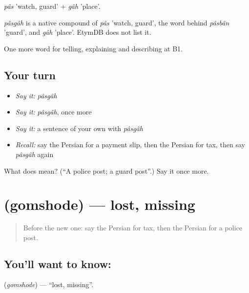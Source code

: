 \emph{pâs} 'watch, guard' + \emph{gâh} 'place'.

\begin{cousinweb}
\emph{pâsgâh} is a native compound of \emph{pâs} 'watch, guard', the word behind \emph{pâsbân} 'guard', and \emph{gâh} 'place'. EtymDB does not list it.
\end{cousinweb}

\begin{grammarlens}[title={What you've built}]
One more word for telling, explaining and describing at B1.
\end{grammarlens}

\subsection*{Your turn}
\begin{itemize}
\raggedright
  \item \emph{Say it:} \emph{pâsgâh}
  \item \emph{Say it:} \emph{pâsgâh}, once more
  \item \emph{Say it:} a sentence of your own with \emph{pâsgâh}
  \item \emph{Recall:} say the Persian for a payment slip, then the Persian for tax, then say \emph{pâsgâh} again
\end{itemize}

\begin{tcolorbox}[breakable,colback=teal!4,colframe=teal!35!black,title={Before you move on}]
What does  mean? (\textquotedblleft{}A police post; a guard post\textquotedblright{}.) Say it once more.
\end{tcolorbox}
\section[\texorpdfstring{\fa{گمشده} (gomshode)}{گمشده (gomshode)}]{ (gomshode) — lost, missing}

\label{lesson:FA-C453-gomshode}



\begin{quote}
Before the new one: say the Persian for tax, then the Persian for a police post.
\end{quote}

\subsection*{You'll want to know: }
\textbf{} (\emph{gomshode}) — \textquotedblleft{}lost, missing\textquotedblright{}.

